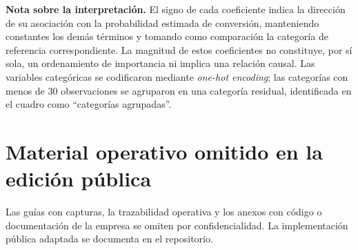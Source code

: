 \textbf{Nota sobre la interpretación.} El signo de cada coeficiente indica la
dirección de su asociación con la probabilidad estimada de conversión, manteniendo
constantes los demás términos y tomando como comparación la categoría de referencia
correspondiente. La magnitud de estos coeficientes no constituye, por sí sola, un
ordenamiento de importancia ni implica una relación causal. Las variables categóricas
se codificaron mediante \emph{one-hot encoding}; las categorías con menos de 30
observaciones se agruparon en una categoría residual, identificada en el cuadro como
``categorías agrupadas''.


\chapter{Material operativo omitido en la edición pública}
\label{anx:guias-tecnicas}
\label{anx:guia-powerbi-paso1}
\label{anx:guia-scoring-paso2}
\label{anx:guia-dashboard-comercial}
\label{anx:manual-componentes-codigo}
\label{anx:trazabilidad}
\label{anx:cuad-traza}
\label{anx:codigo-fuente}
Las guías con capturas, la trazabilidad operativa y los anexos con código o documentación de la empresa se omiten por confidencialidad. La implementación pública adaptada se documenta en el repositorio.
